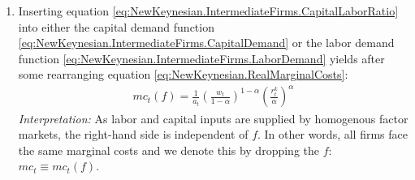 \begin{enumerate}
\item Inserting equation \eqref{eq:NewKeynesian.IntermediateFirms.CapitalLaborRatio} into
  either the capital demand function \eqref{eq:NewKeynesian.IntermediateFirms.CapitalDemand}
  or the labor demand function \eqref{eq:NewKeynesian.IntermediateFirms.LaborDemand}
  yields after some rearranging equation \eqref{eq:NewKeynesian.RealMarginalCosts}:
\begin{align*}
mc_t(f) = \frac{1}{a_t} \left(\frac{w_t}{1-\alpha}\right)^{1-\alpha} \left(\frac{r^k_t}{\alpha}\right)^{\alpha}
\end{align*}
\emph{Interpretation:} As labor and capital inputs are supplied by homogenous factor markets,
  the right-hand side is independent of $f$.
In other words, all firms face the same marginal costs and we denote this by dropping the $f$: $mc_t \equiv mc_t(f)$.
	


\end{enumerate}
